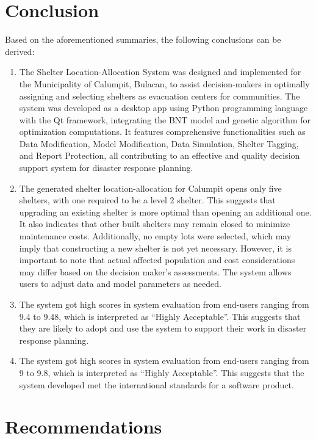 \section{Conclusion}
	Based on the aforementioned summaries, the following conclusions can be derived:

	\begin{enumerate}
		\item The Shelter Location-Allocation System was designed and implemented for the Municipality of Calumpit, Bulacan, to assist decision-makers in optimally assigning and selecting shelters as evacuation centers for communities. The system was developed as a desktop app using Python programming language with the Qt framework, integrating the BNT model and genetic algorithm for optimization computations. It features comprehensive functionalities such as Data Modification, Model Modification, Data Simulation, Shelter Tagging, and Report Protection, all contributing to an effective and quality decision support system for disaster response planning.
		\item The generated shelter location-allocation for Calumpit opens only five shelters, with one required to be a level 2 shelter. This suggests that upgrading an existing shelter is more optimal than opening an additional one. It also indicates that other built shelters may remain closed to minimize maintenance costs. Additionally, no empty lots were selected, which may imply that constructing a new shelter is not yet necessary. However, it is important to note that actual affected population and cost considerations may differ based on the decision maker's assessments. The system allows users to adjust data and model parameters as needed.
		\item The system got high scores in system evaluation from end-users ranging from 9.4 to 9.48, which is interpreted as “Highly Acceptable”. This suggests that they are likely to adopt and use the system to support their work in disaster response planning.
		\item The system got high scores in system evaluation from end-users ranging from 9 to 9.8, which is interpreted as “Highly Acceptable”. This suggests that the system developed met the international standards for a software product.
	\end{enumerate}

\section{Recommendations}